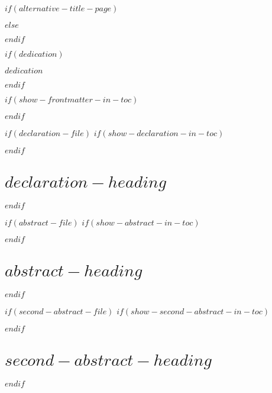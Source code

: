 \documentclass[a4paper, $if(page-layout)$$page-layout$$endif$]{templates/curtinthesis}
\begin{document}

\setcounter{secnumdepth}{$section-numbering-depth$}
\setcounter{tocdepth}{$toc-depth$}

\begin{romanpages}

$if(alternative-title-page)$

$else$
\maketitle
$endif$

$if(dedication)$
\begin{dedication}
  $dedication$
\end{dedication}
$endif$

$if(show-frontmatter-in-toc)$
$endif$

$if(declaration-file)$
  $if(show-declaration-in-toc)$
  $endif$
  \chapter*{$declaration-heading$}
  
$endif$

$if(abstract-file)$
  $if(show-abstract-in-toc)$
  $endif$
  \chapter*{$abstract-heading$}
  
$endif$

$if(second-abstract-file)$
  $if(show-second-abstract-in-toc)$
  $endif$
  \chapter*{$second-abstract-heading$}
  
$endif$


\end{romanpages}
\end{document}
